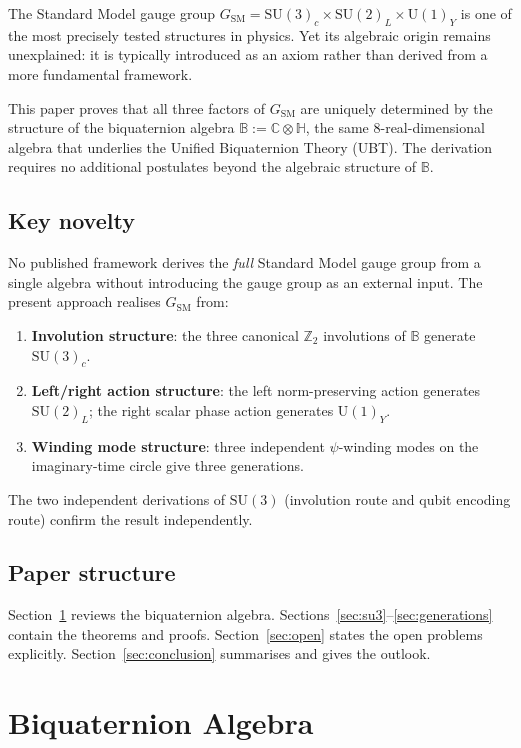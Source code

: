 \documentclass[12pt,a4paper]{article}
\theoremstyle{definition}
\theoremstyle{remark}
\newcommand{\SU}[1]{\mathrm{SU}(#1)}
\newcommand{\UU}[1]{\mathrm{U}(#1)}
\newcommand{\Bq}{\mathbb{C}\otimes\mathbb{H}}
\begin{document}
The Standard Model gauge group
$G_{\mathrm{SM}} = \SU{3}_c\times\SU{2}_L\times\UU{1}_Y$
is one of the most precisely tested structures in physics.  Yet its algebraic
origin remains unexplained: it is typically introduced as an axiom rather than
derived from a more fundamental framework.

This paper proves that all three factors of $G_{\mathrm{SM}}$ are uniquely
determined by the structure of the biquaternion algebra
$\mathbb{B} := \Bq$, the same 8-real-dimensional algebra that underlies the
Unified Biquaternion Theory (UBT).  The derivation requires no additional
postulates beyond the algebraic structure of $\mathbb{B}$.

\subsection{Key novelty}

No published framework derives the \emph{full} Standard Model gauge group from a
single algebra without introducing the gauge group as an external input.  The
present approach realises $G_{\mathrm{SM}}$ from:
\begin{enumerate}
\item \textbf{Involution structure}: the three canonical $\mathbb{Z}_2$
  involutions of $\mathbb{B}$ generate $\SU{3}_c$.
\item \textbf{Left/right action structure}: the left norm-preserving action
  generates $\SU{2}_L$; the right scalar phase action generates $\UU{1}_Y$.
\item \textbf{Winding mode structure}: three independent $\psi$-winding modes
  on the imaginary-time circle give three generations.
\end{enumerate}
The two independent derivations of $\SU{3}$ (involution route and qubit
encoding route) confirm the result independently.

\subsection{Paper structure}

Section~\ref{sec:algebra} reviews the biquaternion algebra.
Sections~\ref{sec:su3}--\ref{sec:generations} contain the theorems and proofs.
Section~\ref{sec:open} states the open problems explicitly.
Section~\ref{sec:conclusion} summarises and gives the outlook.

\section{Biquaternion Algebra}
\label{sec:algebra}
\end{document}

